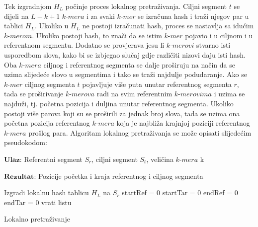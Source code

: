\documentclass[times, utf8, diplomski]{fer}
\begin{document}
Tek izgradnjom $\textit{H}_L$ počinje proces lokalnog pretraživanja. Ciljni segment $t$ se dijeli na $L - k + 1$ $\textit{k-mera}$ i za svaki $\textit{k-mer}$ se izračuna hash i traži njegov par u tablici $\textit{H}_L$. Ukoliko u $\textit{H}_L$ ne postoji izračunati hash, proces se nastavlja sa idućim $\textit{k-merom}$. Ukoliko postoji hash, to znači da se istim $\textit{k-mer}$ pojavio i u ciljnom i u referentnom segmentu. Dodatno se provjerava jesu li $\textit{k-merovi}$ stvarno isti usporedbom slova, kako bi se izbjegao slučaj gdje različiti nizovi daju isti hash. Oba $\textit{k-mera}$ ciljnog i referentnog segmenta se dalje proširuju na način da se uzima slijedeće slovo u segmentima i tako se traži najdulje podudaranje. Ako se $\textit{k-mer}$ ciljnog segmenta $t$ pojavljuje više puta unutar referentnog segmenta $r$, tada se proširivanje $\textit{k-merova}$ radi na svim referentnim $\textit{k-merovima}$ i uzima se najduži, tj. početna pozicija i duljina unutar referentnog segmenta. Ukoliko postoji više parova koji su se proširili za jednak broj slova, tada se uzima ona početna pozicija referentnog $\textit{k-mera}$ koja je najbliža krajnjoj poziciji referentnog $\textit{k-mera}$ prošlog para. Algoritam lokalnog pretraživanja se može opisati slijedećim pseudokodom:\\
\begin{algorithm} [H]
\SetAlgoLined
$\textbf{Ulaz}$: Referentni segment $\textit{S}_r$, ciljni segment $\textit{S}_t$, veličina $\textit{k-mera}$ k

$\textbf{Rezultat}$: Pozicije početka i kraja referentnog i ciljnog segmenta

Izgradi lokalnu hash tablicu $\textit{H}_L$ na $\textit{S}_r$\;
startRef = 0\;
startTar = 0\;
endRef = 0\;
endTar = 0\;
vrati listu\;
\caption{Lokalno pretraživanje}
\end{algorithm}
\end{document}
